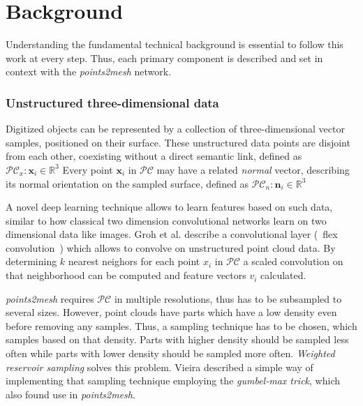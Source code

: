 \chapter{Background}
\label{sec:background}
Understanding the fundamental technical background is essential to follow this work at every step.
Thus, each primary component is described and set in context with the \emph{points2mesh} network. 

\subsection*{Unstructured three-dimensional data}
    Digitized objects can be represented by a collection of three-dimensional vector samples, positioned on their surface.
    These unstructured data points are disjoint from each other, coexisting without a direct semantic link,
     defined as $\mathcal{PC}_x: \textbf{x}_i \in \mathbb{R}^3$
    Every point $\textbf{x}_i$ in $\mathcal{PC}$ may have a related \emph{normal} vector, describing its normal
    orientation on the sampled surface, defined as $\mathcal{PC}_n: \textbf{n}_i \in \mathbb{R}^3$

    A novel deep learning technique allows to learn features based on such data, similar to how classical two
    dimension convolutional networks learn on two dimensional data like images. 
    Groh et al. \cite{Groh2017} describe a convolutional layer (~flex convolution~) which  allows to convolve on
    unstructured point cloud data. By determining $k$ nearest neighors for each point $x_i$ in $\mathcal{PC}$
    a scaled convolution on that neighborhood can be computed and feature vectors $v_i$ calculated.

    \emph{points2mesh} requires $\mathcal{PC}$ in multiple resolutions, thus has to be subsampled to several sizes. However,
    point clouds have parts which have a low density even before removing any samples. Thus, a sampling technique has to be chosen,
    which samples based on that density. Parts with higher density should be sampled less often while parts with lower density should 
    be sampled more often. \emph{Weighted reservoir sampling} solves this problem. Vieira \cite{vieira2014gumbel} described a simple way
    of implementing that sampling technique employing the \emph{gumbel-max trick}, which also found use in \emph{points2mesh}.



